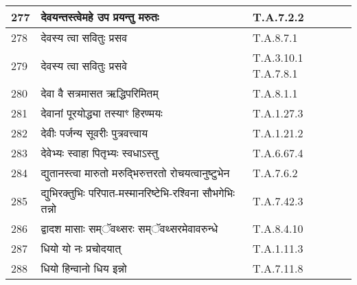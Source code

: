 \documentclass[17pt]{extarticle}
\begin{document}
\begin{longtable}{||p{0.4in}||p{4.9in}||p{0.9in}||}
    \hline
        
    277 & देवयन्तस्त्वेमहे उप प्रयन्तु मरुतः & T.A.7.2.2       \\
    
    \hline
        
    278 & देवस्य त्वा सवितुः प्रसव & T.A.8.7.1       \\
    
    \hline
        
    279 & देवस्य त्वा सवितुः प्रसवे & T.A.3.10.1 T.A.7.8.1       \\
    
    \hline
        
    280 & देवा वै सत्रमासत ऋद्धिपरिमितम् & T.A.8.1.1       \\
    
    \hline
        
    281 & देवानां पूरयोद्ध्या तस्याꣳ हिरण्मयः & T.A.1.27.3       \\
    
    \hline
        
    282 & देवीः पर्जन्य सूवरीः पुत्रवत्त्वाय & T.A.1.21.2       \\
    
    \hline
        
    283 & देवेभ्यः स्वाहा पितृभ्यः स्वधाऽस्तु & T.A.6.67.4       \\
    
    \hline
        
    284 & द्युतानस्त्वा मारुतो मरुद्भिरुत्तरतो रोचयत्वानुष्टुभेन & T.A.7.6.2       \\
    
    \hline
        
    285 & द्युभिरक्तुभिः परिपात{-}मस्मानरिष्टेभि{-}रश्विना सौभगेभिः तन्नो & T.A.7.42.3       \\
    
    \hline
        
    286 & द्वादश मासाः सम्ॅवथ्सरः सम्ॅवथ्सरमेवावरुन्धे & T.A.8.4.10       \\
    
    \hline
        
    287 & धियो यो नः प्रचोदयात् & T.A.1.11.3       \\
    
    \hline
        
    288 & धियो हिन्वानो धिय इन्नो & T.A.7.11.8       \\
    
    \hline
        

\end{longtable}
\end{document}
